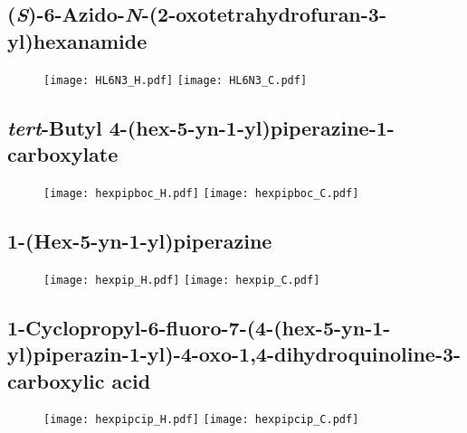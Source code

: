 \subsection{(\textit{S})-6-Azido-\textit{N}-(2-oxotetrahydrofuran-3-yl)hexanamide }

\begin{figure}[H]
	\centering
		\texttt{[image: HL6N3\_H.pdf]}
		\texttt{[image: HL6N3\_C.pdf]}
\end{figure}

\subsection{\textit{tert}-Butyl 4-(hex-5-yn-1-yl)piperazine-1-carboxylate }

\begin{figure}[H]
	\centering
		\texttt{[image: hexpipboc\_H.pdf]}
		\texttt{[image: hexpipboc\_C.pdf]}
\end{figure}

\subsection{1-(Hex-5-yn-1-yl)piperazine }

\begin{figure}[H]
	\centering
		\texttt{[image: hexpip\_H.pdf]}
		\texttt{[image: hexpip\_C.pdf]}
\end{figure}

\subsection{1-Cyclopropyl-6-fluoro-7-(4-(hex-5-yn-1-yl)piperazin-1-yl)-4-oxo-1,4\hyp{}dihydro\-quinoline-3-carboxylic acid }

\begin{figure}[H]
	\centering
		\texttt{[image: hexpipcip\_H.pdf]}
		\texttt{[image: hexpipcip\_C.pdf]}
\end{figure}